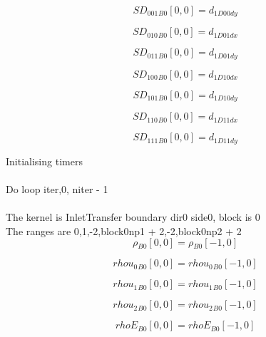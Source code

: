 \documentclass{article}
\begin{document}
\begin{dmath}{SD_{001}{_{B0}}}[{0,0}] = d_{1 D00 dy}\end{dmath}

\begin{dmath}{SD_{010}{_{B0}}}[{0,0}] = d_{1 D01 dx}\end{dmath}

\begin{dmath}{SD_{011}{_{B0}}}[{0,0}] = d_{1 D01 dy}\end{dmath}

\begin{dmath}{SD_{100}{_{B0}}}[{0,0}] = d_{1 D10 dx}\end{dmath}

\begin{dmath}{SD_{101}{_{B0}}}[{0,0}] = d_{1 D10 dy}\end{dmath}

\begin{dmath}{SD_{110}{_{B0}}}[{0,0}] = d_{1 D11 dx}\end{dmath}

\begin{dmath}{SD_{111}{_{B0}}}[{0,0}] = d_{1 D11 dy}\end{dmath}

\noindent Initialising timers\\
\\\noindent Do loop iter,0, niter - 1\\
\\\noindent The kernel is InletTransfer boundary dir0 side0, block is 0\\\noindent The ranges are 0,1,-2,block0np1 + 2,-2,block0np2 + 2\\\begin{dmath}{\rho{_{B0}}}[{0,0}] = {\rho{_{B0}}}[{-1,0}]\end{dmath}

\begin{dmath}{rhou_{0}{_{B0}}}[{0,0}] = {rhou_{0}{_{B0}}}[{-1,0}]\end{dmath}

\begin{dmath}{rhou_{1}{_{B0}}}[{0,0}] = {rhou_{1}{_{B0}}}[{-1,0}]\end{dmath}

\begin{dmath}{rhou_{2}{_{B0}}}[{0,0}] = {rhou_{2}{_{B0}}}[{-1,0}]\end{dmath}

\begin{dmath}{rhoE{_{B0}}}[{0,0}] = {rhoE{_{B0}}}[{-1,0}]\end{dmath}
\end{document}
